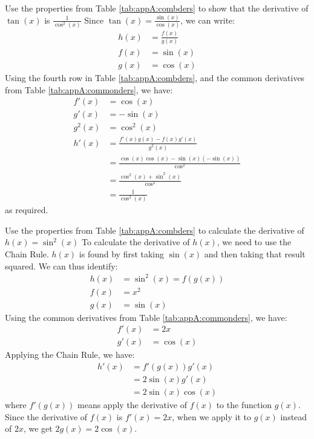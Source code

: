 \begin{example}{Use the properties from Table \ref{tab:appA:combders} to show that the derivative of $\tan(x)$ is $\frac{1}{\cos^2(x)}$}
Since $\tan(x)=\frac{\sin(x)}{\cos(x)}$, we can write:
\begin{align*}
h(x) &= \frac{f(x)}{g(x)} \\
f(x) &= \sin(x)\\
g(x) &= \cos(x)
\end{align*}
Using the fourth row in Table \ref{tab:appA:combders}, and the common derivatives from Table \ref{tab:appA:commonders}, we have:
\begin{align*}
f'(x) &= \cos(x) \\
g'(x) &= -\sin(x) \\
g^2(x) &= \cos^2(x) \\
h'(x) &=\frac{f'(x)g(x)-f(x)g'(x)}{g^2(x)}\\ 
&= \frac{\cos(x)\cos(x) - \sin(x) (-\sin(x))}{\cos^2}\\
&=\frac{\cos^2(x)+\sin^2(x)}{\cos^2}\\
&=\frac{1}{\cos^2(x)}
\end{align*}
as required.
\end{example}

\begin{example}{Use the properties from Table \ref{tab:appA:combders} to calculate the derivative of $h(x)=\sin^2(x)$}
To calculate the derivative of $h(x)$, we need to use the Chain Rule. $h(x)$ is found by first taking $\sin(x)$ and then taking that result squared. We can thus identify:
\begin{align*}
h(x) &= \sin^2(x) = f(g(x))\\
f(x) &= x^2 \\
g(x) &= \sin(x)
\end{align*}
Using the common derivatives from Table \ref{tab:appA:commonders}, we have:
\begin{align*}
f'(x) &= 2x \\
g'(x) &= \cos(x)
\end{align*}
Applying the Chain Rule, we have:
\begin{align*}
h'(x) &= f'(g(x))g'(x)\\
&= 2\sin(x)g'(x)\\
&= 2\sin(x)\cos(x)
\end{align*}
where $f'(g(x))$ means apply the derivative of $f(x)$ to the function $g(x)$. Since the derivative of $f(x)$ is $f'(x)=2x$, when we apply it to $g(x)$ instead of $2x$, we get $2g(x)=2\cos(x)$.
\end{example}
\newpage
